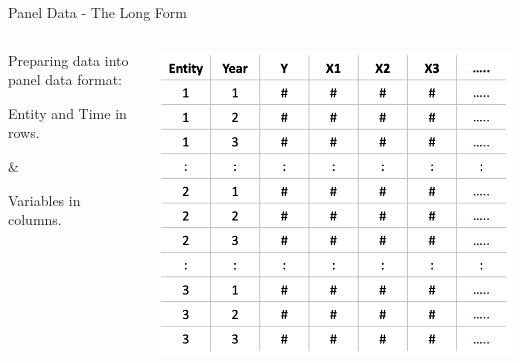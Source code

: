 \documentclass[
  10pt,
  ignorenonframetext,
]{beamer}
\begin{document}
\begin{frame}{Panel Data - The Long Form}
\protect\hypertarget{panel-data---the-long-form}{}
\begin{columns}[T]
\begin{column}{.3\textwidth}
\vspace{2cm}

\normalsize

Preparing data into panel data format:

\small
\vspace{2mm}

Entity and Time in rows.

\(\&\)

Variables in columns.
\end{column}

\begin{column}{0.48\textwidth}
\begin{flushright}\includegraphics[width=1.2\linewidth]{pictures/PanelData_longform} \end{flushright}
\end{column}
\end{columns}
\end{frame}
\end{document}
